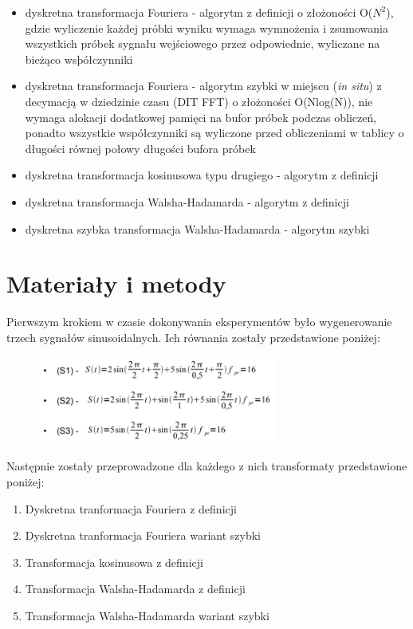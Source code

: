 \documentclass{article}
\begin{document}
        \begin{itemize}
            \item dyskretna transformacja Fouriera - algorytm z
                definicji o złożoności O($N^2$), gdzie wyliczenie
                każdej próbki wyniku wymaga wymnożenia i zsumowania
                wszystkich próbek sygnału wejściowego przez
                odpowiednie, wyliczane na bieżąco wsþółczynniki
            \item dyskretna transformacja Fouriera - algorytm szybki w
                miejscu (\emph{in situ}) z decymacją w dziedzinie
                czasu (DIT FFT) o złożoności O(Nlog(N)), nie wymaga
                alokacji dodatkowej pamięci na bufor próbek podczas
                obliczeń, ponadto wszystkie współczynniki są wyliczone
                przed obliczeniami w tablicy o długości równej połowy
                długości bufora próbek
            \item dyskretna transformacja kosinusowa typu drugiego -
                algorytm z definicji
            \item dyskretna transformacja Walsha-Hadamarda - algorytm z
                definicji
            \item dyskretna szybka transformacja Walsha-Hadamarda -
                algorytm szybki
        \end{itemize}

\section{Materiały i metody} 
    Pierwszym krokiem w czasie dokonywania eksperymentów było wygenerowanie trzech sygnałów
        sinusoidalnych. Ich równania zostały przedstawione poniżej:
        \begin{figure}[h!]
            \centering
            \includegraphics[width=0.7\textwidth]{img/equations.png}
        \end{figure}
        Następnie zostały przeprowadzone dla każdego z nich transformaty przedstawione poniżej:
        \begin{enumerate}
            \item Dyskretna tranformacja Fouriera z definicji
            \item Dyskretna tranformacja Fouriera wariant szybki
            \item Transformacja kosinusowa z definicji
            \item Transformacja Walsha-Hadamarda z definicji
            \item Transformacja Walsha-Hadamarda wariant szybki
        \end{enumerate}
\end{document}

